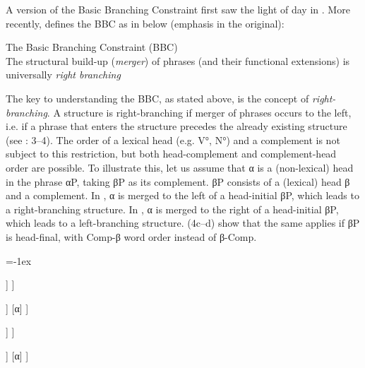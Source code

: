 \documentclass[output=paper, colorlinks, citecolor=brown]{langscibook}
\begin{document}
A version of the Basic Branching Constraint first saw the light of day in \citet{Haider1992}. More recently, \citet[3]{Haider2013} defines the BBC as in  below (emphasis in the original):

\ea
\label{ex:sangfelt:3}
The Basic Branching Constraint (BBC)\\
The structural build-up (\textit{merger}) of phrases (and their functional extensions) is 
universally \textit{right branching}
\z 


The key to understanding the BBC, as stated above, is the concept of \textit{right-branching}. A structure is right-branching if merger of phrases occurs to the left, i.e. if a phrase that enters the structure precedes the already existing structure (see \citealt{Haider2013}: 3–4). The order of a lexical head (e.g. V°, N°) and a complement is not subject to this restriction, but both head-complement and complement-head order are possible. To illustrate this, let us assume that α is a (non-lexical) head in the phrase αP, taking βP as its complement. βP consists of a (lexical) head β and a complement. In , α is merged to the left of a head-initial βP, which leads to a right-branching structure. In , α is merged to the right of a head-initial βP, which leads to a left-branching structure. (4c–d) show that the same applies if βP is head-final, with Comp-β word order instead of β{}-Comp.


\ea
\label{ex:sangfelt:4} 
\columnsep=-1ex
\begin{multicols}{4}
\ea \label{ex:sangfelt:4a}
\begin{forest}
	[αP
		 [α]
		  [βP 
		  	 [β] 
		  	 [Comp]
  	 	 ]
	 ]
\end{forest}

\ex\label{ex:sangfelt:4b} 
\begin{forest}
	[αP 
		[βP 
			[β] 
			[Comp]
			]
		[α] 
	]	
\end{forest}

\ex \label{ex:sangfelt:4c} 
\begin{forest}
	[αP
		[α]
		[βP
			[Comp] 
			[β]
		]
	]
\end{forest}

\ex \label{ex:sangfelt:4d} 
\begin{forest}
		[αP
			[βP
				[Comp]
				[β]
			]
			[α]
		]
\end{forest}

\z 
\end{multicols}
\z
\end{document}
